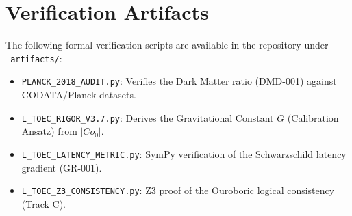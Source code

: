 \documentclass[11pt,titlepage]{article}
\begin{document}
\section{Verification Artifacts}
The following formal verification scripts are available in the repository under \texttt{\_artifacts/}:
\begin{itemize}
    
\item \texttt{PLANCK\_2018\_AUDIT.py}: Verifies the Dark Matter ratio (DMD-001) against CODATA/Planck datasets.
    
\item \texttt{L\_TOEC\_RIGOR\_V3.7.py}: Derives the Gravitational Constant $G$ (Calibration Ansatz) from $|Co_0|$.
    
\item \texttt{L\_TOEC\_LATENCY\_METRIC.py}: SymPy verification of the Schwarzschild latency gradient (GR-001).
    
\item \texttt{L\_TOEC\_Z3\_CONSISTENCY.py}: Z3 proof of the Ouroboric logical consistency (Track C).
\end{itemize}





\end{document}
